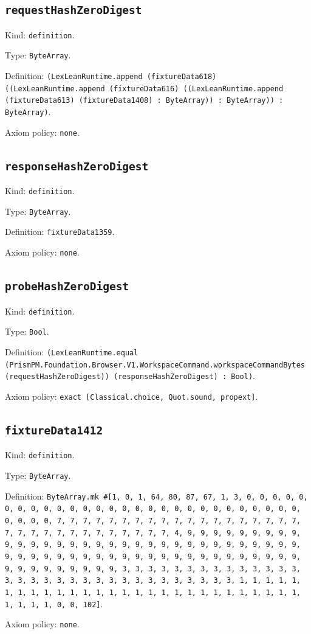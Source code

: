 \documentclass[11pt]{article}
\begin{document}
\subsection*{\texttt{requestHashZeroDigest}}
\noindent Kind: \texttt{definition}.\par
\noindent Type: \texttt{ByteArray}.\par
\noindent Definition: \texttt{(LexLeanRuntime.append (fixtureData618) ((LexLeanRuntime.append (fixtureData616) ((LexLeanRuntime.append (fixtureData613) (fixtureData1408) : ByteArray)) : ByteArray)) : ByteArray)}.\par
\noindent Axiom policy: \texttt{none}.\par
\subsection*{\texttt{responseHashZeroDigest}}
\noindent Kind: \texttt{definition}.\par
\noindent Type: \texttt{ByteArray}.\par
\noindent Definition: \texttt{fixtureData1359}.\par
\noindent Axiom policy: \texttt{none}.\par
\subsection*{\texttt{probeHashZeroDigest}}
\noindent Kind: \texttt{definition}.\par
\noindent Type: \texttt{Bool}.\par
\noindent Definition: \texttt{(LexLeanRuntime.equal (PrismPM.Foundation.Browser.V1.WorkspaceCommand.workspaceCommandBytes (requestHashZeroDigest)) (responseHashZeroDigest) : Bool)}.\par
\noindent Axiom policy: \texttt{exact [Classical.choice, Quot.sound, propext]}.\par
\subsection*{\texttt{fixtureData1412}}
\noindent Kind: \texttt{definition}.\par
\noindent Type: \texttt{ByteArray}.\par
\noindent Definition: \texttt{ByteArray.mk \#[1, 0, 1, 64, 80, 87, 67, 1, 3, 0, 0, 0, 0, 0, 0, 0, 0, 0, 0, 0, 0, 0, 0, 0, 0, 0, 0, 0, 0, 0, 0, 0, 0, 0, 0, 0, 0, 0, 0, 0, 0, 7, 7, 7, 7, 7, 7, 7, 7, 7, 7, 7, 7, 7, 7, 7, 7, 7, 7, 7, 7, 7, 7, 7, 7, 7, 7, 7, 7, 7, 7, 7, 7, 4, 9, 9, 9, 9, 9, 9, 9, 9, 9, 9, 9, 9, 9, 9, 9, 9, 9, 9, 9, 9, 9, 9, 9, 9, 9, 9, 9, 9, 9, 9, 9, 9, 9, 9, 9, 9, 9, 9, 9, 9, 9, 9, 9, 9, 9, 9, 9, 9, 9, 9, 9, 9, 9, 9, 9, 9, 9, 9, 9, 9, 9, 9, 9, 9, 3, 3, 3, 3, 3, 3, 3, 3, 3, 3, 3, 3, 3, 3, 3, 3, 3, 3, 3, 3, 3, 3, 3, 3, 3, 3, 3, 3, 3, 3, 3, 3, 1, 1, 1, 1, 1, 1, 1, 1, 1, 1, 1, 1, 1, 1, 1, 1, 1, 1, 1, 1, 1, 1, 1, 1, 1, 1, 1, 1, 1, 1, 1, 1, 0, 0, 102]}.\par
\noindent Axiom policy: \texttt{none}.\par
\end{document}
